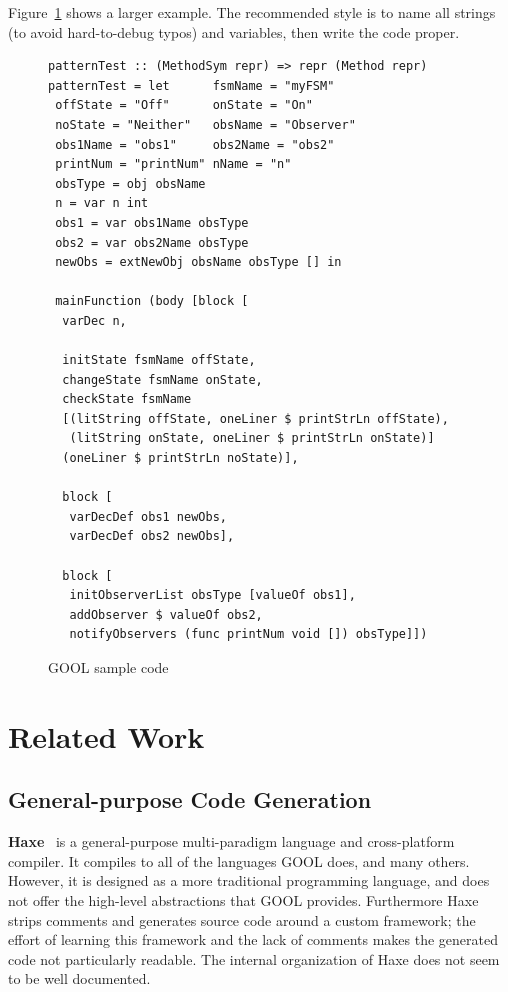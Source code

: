 \documentclass[sigplan,screen,10pt]{acmart}
\begin{document}
Figure~\ref{fig:code} shows a larger example.  The recommended style is
to name all strings (to avoid hard-to-debug typos) and variables, then
write the code proper.
\begin{figure}[tb]
\begin{lstlisting}
patternTest :: (MethodSym repr) => repr (Method repr)
patternTest = let      fsmName = "myFSM"
 offState = "Off"      onState = "On"
 noState = "Neither"   obsName = "Observer"
 obs1Name = "obs1"     obs2Name = "obs2"
 printNum = "printNum" nName = "n"
 obsType = obj obsName
 n = var n int
 obs1 = var obs1Name obsType
 obs2 = var obs2Name obsType
 newObs = extNewObj obsName obsType [] in
   
 mainFunction (body [block [
  varDec n,

  initState fsmName offState, 
  changeState fsmName onState,
  checkState fsmName 
  [(litString offState, oneLiner $ printStrLn offState), 
   (litString onState, oneLiner $ printStrLn onState)] 
  (oneLiner $ printStrLn noState)],

  block [
   varDecDef obs1 newObs, 
   varDecDef obs2 newObs],

  block [
   initObserverList obsType [valueOf obs1], 
   addObserver $ valueOf obs2,
   notifyObservers (func printNum void []) obsType]])
\end{lstlisting}
\caption{GOOL sample code}
\label{fig:code}
\end{figure}

\section{Related Work} \label{sec:related}

\subsection{General-purpose Code Generation}

\textbf{Haxe}~\cite{Haxe} is a general-purpose multi-paradigm language and cross-platform
compiler.  It compiles to all of the languages GOOL does, and many
others.  However, it is designed as a more traditional programming language, and
does not offer the high-level abstractions that GOOL provides. Furthermore
Haxe strips comments and generates source code around a custom framework; 
the effort of learning this framework and the lack of comments makes the generated
code not particularly readable. The internal organization of Haxe does not seem
to be well documented.
\end{document}
